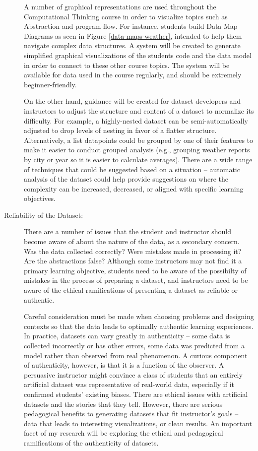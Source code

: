 \begin{description}
		A number of graphical representations are used throughout the Computational Thinking course in order to visualize topics such as Abstraction and program flow.
		For instance, students build Data Map Diagrams as seen in Figure \ref{data-maps-weather}, intended to help them navigate complex data structures.
		A system will be created to generate simplified graphical visualizations of the students code and the data model in order to connect to these other course topics.
		The system will be available for data used in the course regularly, and should be extremely beginner-friendly.
		
		On the other hand, guidance will be created for dataset developers and instructors to adjust the structure and content of a dataset to normalize its difficulty.
		For example, a highly-nested dataset can be semi-automatically adjusted to drop levels of nesting in favor of a flatter structure.
		Alternatively, a list datapoints could be grouped by one of their features to make it easier to conduct grouped analysis (e.g., grouping weather reports by city or year so it is easier to calculate averages).
		There are a wide range of techniques that could be suggested based on a situation -- automatic analysis of the dataset could help provide suggestions on where the complexity can be increased, decreased, or aligned with specific learning objectives. 
	\item[Reliability of the Dataset:] There are a number of issues that the student and instructor should become aware of about the nature of the data, as a secondary concern. Was the data collected correctly? Were mistakes made in processing it? Are the abstractions false? Although some instructors may not find it a primary learning objective, students need to be aware of the possibilty of mistakes in the process of preparing a dataset, and instructors need to be aware of the ethical ramifications of presenting a dataset as reliable or authentic.
	
Careful consideration must be made when choosing problems and designing contexts so that the data leads to optimally authentic learning experiences.
In practice, datasets can vary greatly in authenticity -- some data is collected incorrectly or has other errors, some data was predicted from a model rather than observed from real phenomenon.
A curious component of authenticity, however, is that it is a function of the observer.
A persuasive instructor might convince a class of students that an entirely artificial dataset was representative of real-world data, especially if it confirmed students' existing biases.
There are ethical issues with artificial datasets and the stories that they tell.
However, there are serious pedagogical benefits to generating datasets that fit instructor's goals -- data that leads to interesting visualizations, or clean results.
An important facet of my research will be exploring the ethical and pedagogical ramifications of the authenticity of datasets.


\end{description}
